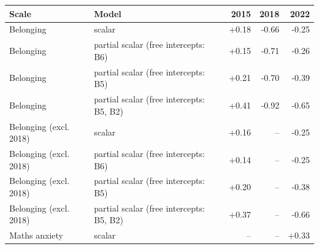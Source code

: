 \begin{tabular}{@{}llrrr@{}}
\toprule
Scale & Model & 2015 & 2018 & 2022 \\
\midrule
Belonging & scalar & +0.18 & -0.66 & -0.25 \\
Belonging & partial scalar (free intercepts: B6) & +0.15 & -0.71 & -0.26 \\
Belonging & partial scalar (free intercepts: B5) & +0.21 & -0.70 & -0.39 \\
Belonging & partial scalar (free intercepts: B5, B2) & +0.41 & -0.92 & -0.65 \\
Belonging (excl. 2018) & scalar & +0.16 & -- & -0.25 \\
Belonging (excl. 2018) & partial scalar (free intercepts: B6) & +0.14 & -- & -0.25 \\
Belonging (excl. 2018) & partial scalar (free intercepts: B5) & +0.20 & -- & -0.38 \\
Belonging (excl. 2018) & partial scalar (free intercepts: B5, B2) & +0.37 & -- & -0.66 \\
Maths anxiety & scalar & -- & -- & +0.33 \\
\bottomrule
\end{tabular}
